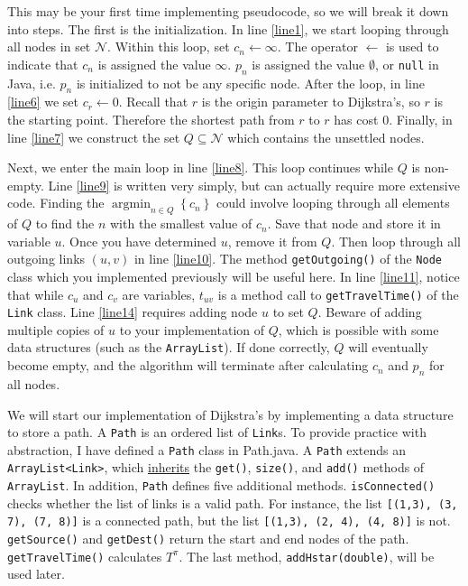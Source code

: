 \documentclass[12pt]{article}
\newcommand{\N}{\mathcal{N}}
\DeclareMathOperator*{\argmin}{\arg\min}
\begin{document}
\vspace{\baselineskip}

\noindent This may be your first time implementing pseudocode, so we will break it down into steps. The first is the initialization. In line \ref{line1}, we start looping through all nodes in set $\N$. Within this loop, set $c_n \leftarrow \infty$. The operator $\leftarrow$ is used to indicate that $c_n$ is assigned the value $\infty$. $p_n$ is assigned the value $\emptyset$, or \texttt{null} in Java, i.e. $p_n$ is initialized to not be any specific node. After the loop, in line \ref{line6} we set $c_r\leftarrow 0$. Recall that $r$ is the origin parameter to Dijkstra's, so $r$ is the starting point. Therefore the shortest path from $r$ to $r$ has cost $0$. Finally, in line \ref{line7} we construct the set $Q\subseteq\N$ which contains the unsettled nodes. 

Next, we enter the main loop in line \ref{line8}. This loop continues while $Q$ is non-empty. Line \ref{line9} is written very simply, but can actually require more extensive code. Finding the $\argmin_{n\in Q} \left\{c_n\right\}$ could involve looping through all elements of $Q$ to find the $n$ with the smallest value of $c_n$. Save that node and store it in variable $u$. Once you have determined $u$, remove it from $Q$. Then loop through all outgoing links $(u,v)$ in line \ref{line10}. The method \texttt{getOutgoing()} of the \texttt{Node} class which you implemented previously will be useful here. In line \ref{line11}, notice that while $c_u$ and $c_v$ are variables, $t_{uv}$ is a method call to \texttt{getTravelTime()} of the \texttt{Link} class. Line \ref{line14} requires adding node $u$ to set $Q$. Beware of adding multiple copies of $u$ to your implementation of $Q$, which is possible with some data structures (such as the \texttt{ArrayList}). If done correctly, $Q$ will eventually become empty, and the algorithm will terminate after calculating $c_n$ and $p_n$ for all nodes. 






We will start our implementation of Dijkstra's by implementing a data structure to store a path. 
A \texttt{Path} is an ordered list of \texttt{Link}s. To provide practice with abstraction, I have defined a \texttt{Path} class in Path.java. A \texttt{Path} extends an \texttt{ArrayList<Link>}, which \href{https://www.w3schools.com/java/java_inheritance.asp}{inherits} the \texttt{get()}, \texttt{size()}, and \texttt{add()} methods of \texttt{ArrayList}. In addition, \texttt{Path} defines five additional methods. \texttt{isConnected()} checks whether the list of links is a valid path. For instance, the list \texttt{[(1,3), (3, 7), (7, 8)]} is a connected path, but the list \texttt{[(1,3), (2, 4), (4, 8)]} is not. \texttt{getSource()} and \texttt{getDest()} return the start and end nodes of the path.
\texttt{getTravelTime()} calculates $T^\pi$. The last method, \texttt{addHstar(double)}, will be used later.
\end{document}
